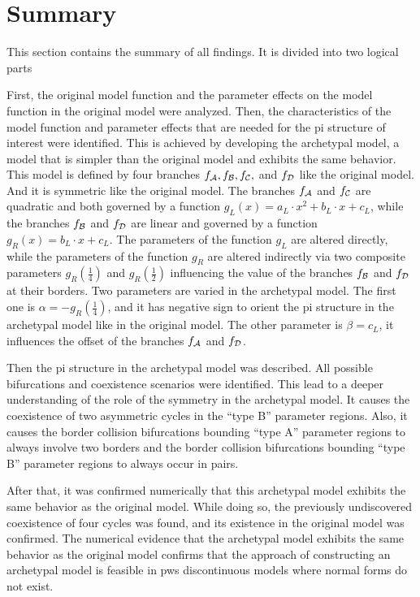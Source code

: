 \section{Summary}
\label{sec:concl.sum}

This section contains the summary of all findings.
It is divided into two logical parts

First, the original model function and the parameter effects on the model function in the original model were analyzed.
Then, the characteristics of the model function and parameter effects that are needed for the \gls{pi} structure of interest were identified.
This is achieved by developing the archetypal model, a model that is simpler than the original model and exhibits the same behavior.
This model is defined by four branches $f_{\mathcal{A}}, f_{\mathcal{B}}, f_{\mathcal{C}},$ and $f_{\mathcal{D}}$ like the original model.
And it is symmetric like the original model.
The branches $f_{\mathcal{A}}$ and $f_{\mathcal{C}}$ are quadratic and both governed by a function $g_L(x) = a_L \cdot x^2 + b_L \cdot x + c_L$, while the branches $f_{\mathcal{B}}$ and $f_{\mathcal{D}}$ are linear and governed by a function $g_R(x) = b_L \cdot x + c_L$.
The parameters of the function $g_L$ are altered directly, while the parameters of the function $g_R$ are altered indirectly via two composite parameters $g_R\left(\frac{1}{4}\right)$ and $g_R\left(\frac{1}{2}\right)$ influencing the value of the branches $f_{\mathcal{B}}$ and $f_{\mathcal{D}}$ at their borders.
Two parameters are varied in the archetypal model.
The first one is $\alpha = -g_R\left(\frac{1}{4}\right)$, and it has negative sign to orient the \gls{pi} structure in the archetypal model like in the original model.
The other parameter is $\beta = c_L$, it influences the offset of the branches $f_{\mathcal{A}}$ and $f_{\mathcal{D}}$.

Then the \gls{pi} structure in the archetypal model was described.
All possible bifurcations and coexistence scenarios were identified.
This lead to a deeper understanding of the role of the symmetry in the archetypal model.
It causes the coexistence of two asymmetric cycles in the ``type B'' parameter regions.
Also, it causes the border collision bifurcations bounding ``type A'' parameter regions to always involve two borders
and the border collision bifurcations bounding ``type B'' parameter regions to always occur in pairs.

After that, it was confirmed numerically that this archetypal model exhibits the same behavior as the original model.
While doing so, the previously undiscovered coexistence of four cycles was found, and its existence in the original model was confirmed.
The numerical evidence that the archetypal model exhibits the same behavior as the original model confirms that the approach of constructing an archetypal model is feasible in \gls{pws} discontinuous models where normal forms do not exist.

